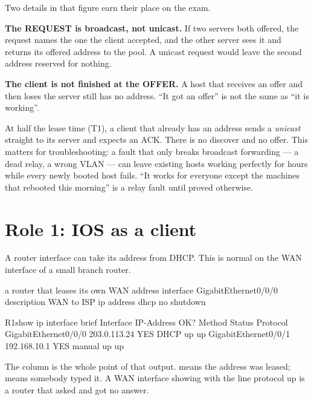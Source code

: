 Two details in that figure earn their place on the exam.

\begin{tight}
  \item \textbf{The REQUEST is broadcast, not unicast.} If two servers both
        offered, the request names the one the client accepted, and the other
        server sees it and returns its offered address to the pool. A unicast
        request would leave the second address reserved for nothing.
  \item \textbf{The client is not finished at the OFFER.} A host that receives an
        offer and then loses the server still has no address. ``It got an offer''
        is not the same as ``it is working''.
\end{tight}

\begin{conceptbox}
At half the lease time (T1), a client that already has an address sends a
\emph{unicast}  straight to its server and expects an ACK. There
is no discover and no offer. This matters for troubleshooting: a fault that only
breaks broadcast forwarding --- a dead relay, a wrong VLAN --- can leave existing
hosts working perfectly for hours while every newly booted host fails. ``It works
for everyone except the machines that rebooted this morning'' is a relay fault
until proved otherwise.
\end{conceptbox}

\section{Role 1: IOS as a client}

A router interface can take its address from DHCP. This is normal on the WAN
interface of a small branch router.

\begin{config}{a router that leases its own WAN address}
interface GigabitEthernet0/0/0
 description WAN to ISP
 ip address dhcp
 no shutdown
\end{config}

\begin{verify}{R1}{show ip interface brief}
Interface              IP-Address      OK? Method Status                Protocol
GigabitEthernet0/0/0   203.0.113.24    YES DHCP   up                    up
GigabitEthernet0/0/1   192.168.10.1    YES manual up                    up
\end{verify}

The  column is the whole point of that output.  means the
address was leased;  means somebody typed it. A WAN interface showing
 with the line protocol up is a router that asked and got no
answer.

